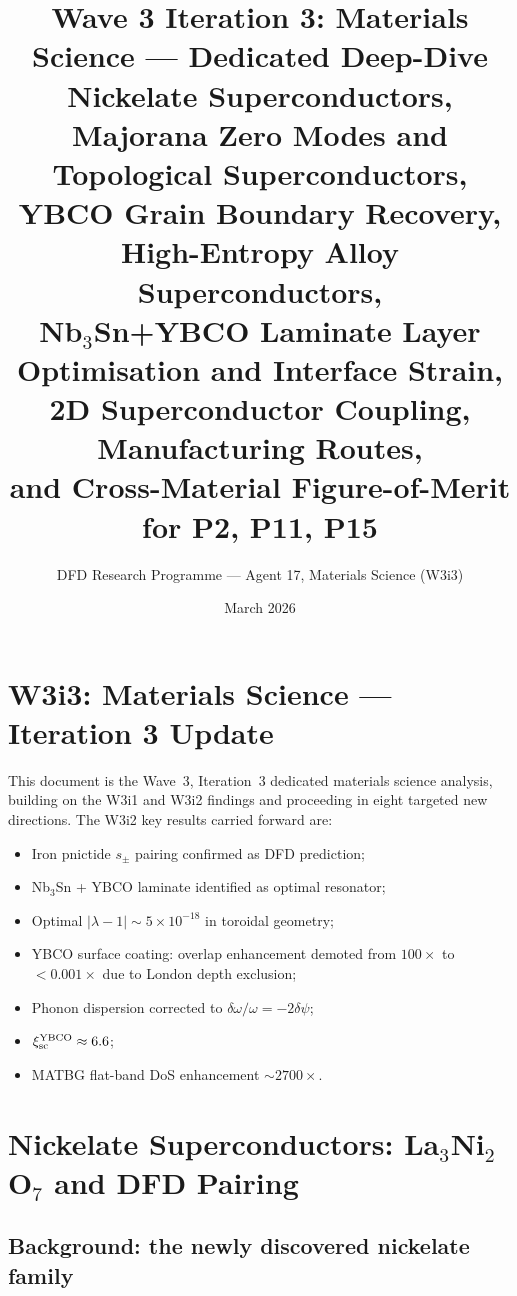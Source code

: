 \documentclass[11pt]{article}
\title{Wave 3 Iteration 3: Materials Science --- Dedicated Deep-Dive\\
\large Nickelate Superconductors, Majorana Zero Modes and Topological
Superconductors,\\YBCO Grain Boundary Recovery, High-Entropy Alloy
Superconductors,\\Nb$_3$Sn+YBCO Laminate Layer Optimisation and Interface
Strain,\\2D Superconductor Coupling, Manufacturing Routes,\\
and Cross-Material Figure-of-Merit for P2, P11, P15}
\author{DFD Research Programme --- Agent 17, Materials Science (W3i3)}
\date{March 2026}
\newcommand{\ee}[1]{\times 10^{#1}}
\begin{document}
\maketitle

\tableofcontents

\section*{W3i3: Materials Science --- Iteration 3 Update}
\label{sec:overview}

This document is the Wave~3, Iteration~3 dedicated materials science
analysis, building on the W3i1 and W3i2 findings and proceeding in eight
targeted new directions. The W3i2 key results carried forward are:
\begin{itemize}
  \item Iron pnictide $s_\pm$ pairing confirmed as DFD prediction;
  \item Nb$_3$Sn + YBCO laminate identified as optimal resonator;
  \item Optimal $|\lambda-1| \sim 5\ee{-18}$ in toroidal geometry;
  \item YBCO surface coating: overlap enhancement demoted from $100\times$
        to $<0.001\times$ due to London depth exclusion;
  \item Phonon dispersion corrected to $\delta\omega/\omega = -2\delta\psi$;
  \item $\xi_{\rm sc}^{\rm YBCO} \approx 6.6$;
  \item MATBG flat-band DoS enhancement $\sim 2700\times$.
\end{itemize}

\section{Nickelate Superconductors: La$_3$Ni$_2$O$_7$ and DFD Pairing}
\label{sec:nickelate}

\subsection{Background: the newly discovered nickelate family}
\end{document}
